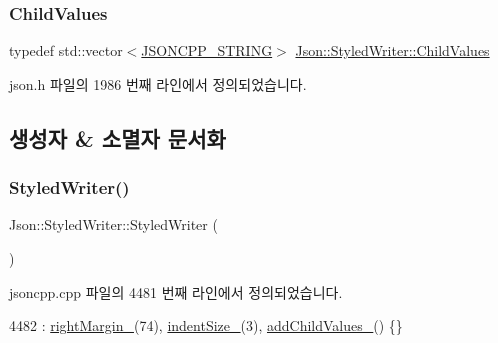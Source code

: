 \subsubsection{\texorpdfstring{Child\+Values}{ChildValues}}
{\footnotesize\ttfamily typedef std\+::vector$<$\hyperlink{json_8h_a1e723f95759de062585bc4a8fd3fa4be}{J\+S\+O\+N\+C\+P\+P\+\_\+\+S\+T\+R\+I\+NG}$>$ \hyperlink{class_json_1_1_styled_writer_a798fcefa41730de612a5cf7e73003e8a}{Json\+::\+Styled\+Writer\+::\+Child\+Values}\hspace{0.3cm}{\ttfamily [private]}}



json.\+h 파일의 1986 번째 라인에서 정의되었습니다.



\subsection{생성자 \& 소멸자 문서화}
\mbox{\label{class_json_1_1_styled_writer_a1f1b5f922a6a0ef0e56c6dd2f6170192}} 
\subsubsection{\texorpdfstring{Styled\+Writer()}{StyledWriter()}}
{\footnotesize\ttfamily Json\+::\+Styled\+Writer\+::\+Styled\+Writer (\begin{DoxyParamCaption}{ }\end{DoxyParamCaption})}



jsoncpp.\+cpp 파일의 4481 번째 라인에서 정의되었습니다.


\begin{DoxyCode}
4482     : \hyperlink{class_json_1_1_styled_writer_ae648d2e1fc0f7d45c748c96805106cb0}{rightMargin\_}(74), \hyperlink{class_json_1_1_styled_writer_a0b5ab768cc56433d463eb1f03da8614e}{indentSize\_}(3), \hyperlink{class_json_1_1_styled_writer_acaabfa48b50a8bb7fa9ce98e2ae971d9}{addChildValues\_}() \{\}
\end{DoxyCode}
\mbox{\label{class_json_1_1_styled_writer_a6a18380a4c5dd5e37a892dc182aac88c}} 
